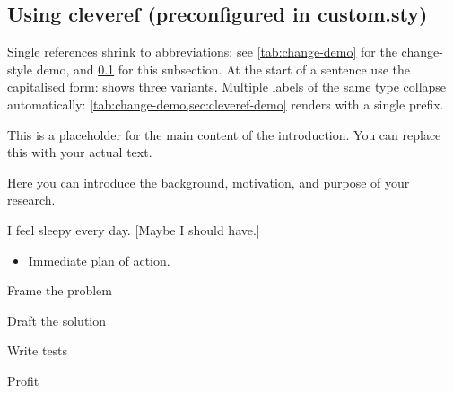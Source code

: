 \documentclass{article}
\begin{document}
\subsection{Using cleveref (preconfigured in custom.sty)}
\label{sec:cleveref-demo}

Single references shrink to abbreviations: see \cref{tab:change-demo} for the
change-style demo, and \cref{sec:cleveref-demo} for this subsection. At the
start of a sentence use the capitalised form:  shows
three variants. Multiple labels of the same type collapse automatically:
\cref{tab:change-demo,sec:cleveref-demo} renders with a single prefix.

This is a placeholder for the main content of the introduction. You can replace this with your actual text.

   

Here you can introduce the background, motivation, and purpose of your research. 

I feel sleepy every day. [Maybe I should have.]

\begin{itemize}
  \item Immediate plan of action.
\end{itemize}

\begin{todolist}
  \item[\done]    Frame the problem
  \item[\wip]     Draft the solution
  \item           Write tests
  \item[\wontfix] Profit
\end{todolist}

\end{document}
